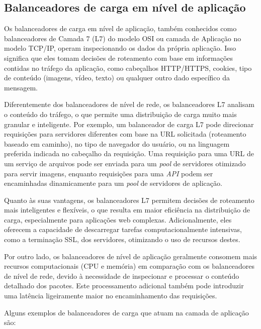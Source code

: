 \subsection{Balanceadores de carga em nível de aplicação}

Os balanceadores de carga em nível de aplicação, também conhecidos como balanceadores de Camada 7 (L7) do modelo OSI ou camada de Aplicação no modelo TCP/IP, operam inspecionando os dados da própria aplicação. Isso significa que eles tomam decisões de roteamento com base em informações contidas no tráfego da aplicação, como cabeçalhos HTTP/HTTPS, cookies, tipo de conteúdo (imagens, vídeo, texto) ou qualquer outro dado específico da mensagem.

Diferentemente dos balanceadores de nível de rede, os balanceadores L7 analisam o conteúdo do tráfego, o que permite uma distribuição de carga muito mais granular e inteligente. Por exemplo, um balanceador de carga L7 pode direcionar requisições para servidores diferentes com base na URL solicitada (roteamento baseado em caminho), no tipo de navegador do usuário, ou na linguagem preferida indicada no cabeçalho da requisição. Uma requisição para uma URL de um serviço de arquivos pode ser enviada para um \textit{pool} de servidores otimizado para servir imagens, enquanto requisições para uma \textit{API} podem ser encaminhadas dinamicamente para um \textit{pool} de servidores de aplicação.

Quanto às suas vantagens, os balanceadores L7 permitem decisões de roteamento mais inteligentes e flexíveis, o que resulta em maior eficiência na distribuição de carga, especialmente para aplicações web complexas. Adicionalmente, eles oferecem a capacidade de descarregar tarefas computacionalmente intensivas, como a terminação SSL, dos servidores, otimizando o uso de recursos destes.

Por outro lado, os balanceadores de nível de aplicação geralmente consomem mais recursos computacionais (CPU e memória) em comparação com os balanceadores de nível de rede, devido à necessidade de inspecionar e processar o conteúdo detalhado dos pacotes. Este processamento adicional também pode introduzir uma latência ligeiramente maior no encaminhamento das requisições.

Alguns exemplos de balanceadores de carga que atuam na camada de aplicação são:

